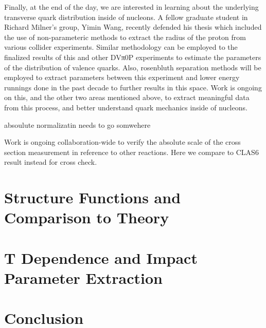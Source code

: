 Finally, at the end of the day, we are interested in learning about the underlying transverse quark distribution inside of
nucleons. A fellow graduate student in Richard Milner’s group, Yimin Wang, recently defended his thesis which included the
use of non-parameteric methods to extract the radius of the proton from various collider experiments. Similar methodology
can be employed to the finalized results of this and other DVπ0P experiments to estimate the parameters of the distribution
of valence quarks. Also, rosenbluth separation methods will be employed to extract parameters between this experiment and
lower energy runnings done in the past decade to further results in this space. Work is ongoing on this, and the other two areas
mentioned above, to extract meaningful data from this process, and better understand quark mechanics inside of nucleons.

absoulute normalizatin needs to go somwehere

Work is ongoing collaboration-wide to verify the absolute scale of the cross section measurement in reference to other reactions. Here we compare to CLAS6 result instead for cross check. 

\section{Structure Functions and Comparison to Theory}
    
    

\section{T Dependence and Impact Parameter Extraction}
    


    




%    

\section{Conclusion}
    











